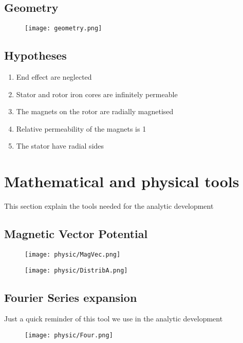 \subsection{Geometry}
\begin{figure}[H]
    \centering
    \texttt{[image: geometry.png]}
\end{figure}

\subsection{Hypotheses}
\begin{enumerate}
    \item End effect are neglected
    \item Stator and rotor iron cores are infinitely permeable
    \item The magnets on the rotor are radially magnetised
    \item Relative permeability of the magnets is 1
    \item The stator have radial sides
\end{enumerate}



\section{Mathematical and physical tools}
This section explain the tools needed for the analytic development 
\subsection{Magnetic Vector Potential}
\begin{figure}[H]
    \centering
    \texttt{[image: physic/MagVec.png]}
\end{figure}

\begin{figure}[H]
    \centering
    \texttt{[image: physic/DistribA.png]}
\end{figure}

\subsection{Fourier Series expansion}
Just a quick reminder of this tool we use in the analytic development

\begin{figure}[H]
    \centering
    \texttt{[image: physic/Four.png]}
\end{figure}

